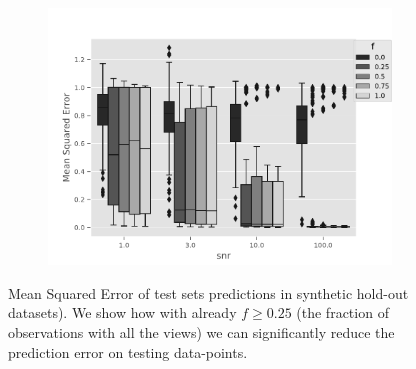 \begin{figure}[htb]
\centering
\begin{subfigure}{.49\textwidth}
	\centering
        \includegraphics[width=\textwidth]{./tex/fig/mar_pred_err_boxplot.pdf}
\end{subfigure}%
\caption{
Mean Squared Error of test sets predictions in synthetic hold-out datasets).
We show how with already $f \geq 0.25$ (the fraction of observations with all the views) we can significantly reduce the prediction error on testing data-points.
}
\label{fig:synthetic_benchmark_pred_box}
\end{figure}

